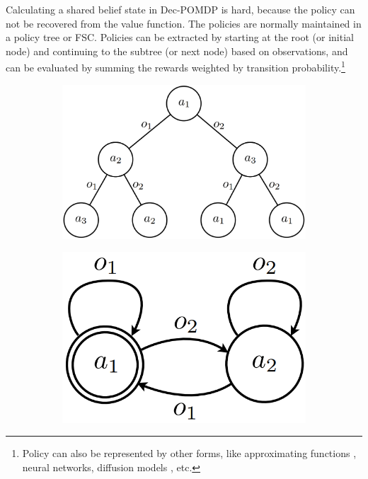 \documentclass{article} %
\begin{document}
Calculating a shared belief state in Dec-POMDP is hard, because the policy can not be recovered from the value function. The policies are normally maintained in a policy tree or FSC. Policies can be extracted by starting at the root (or initial node) and continuing to the subtree (or next node) based on observations, and can be evaluated by summing the rewards weighted by transition probability.\footnote{Policy can also be represented by other forms, like approximating functions \cite{sutton2018reinforcement}, neural networks, diffusion models \cite{chi2024diffusionpolicy}, etc.}
\begin{figure}[h!]
\vspace{-2mm}
\centering
    \begin{subfigure}[b]{.24\textwidth}
        \includegraphics[width=\textwidth]{pt.png}
    \end{subfigure} \hspace{6mm}
    \begin{subfigure}[b]{.12\textwidth}
        \includegraphics[width=\textwidth]{fsc.png}
    \end{subfigure}
\vspace{-4mm}
\end{figure}
\end{document}
